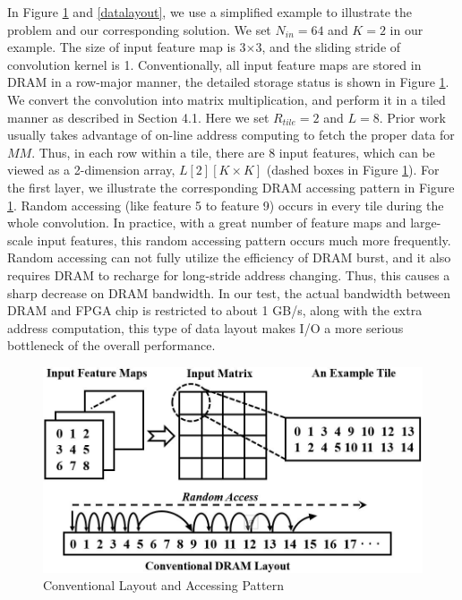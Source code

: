 \documentclass{acm_proc_article-sp-copy}
\begin{document}
In Figure \ref{conventional} and \ref{datalayout}, we use a simplified example to illustrate the problem and our corresponding solution. We set $N_{in}=64$ and $K=2$ in our example. The size of input feature map is 3$\times$3, and the sliding stride of convolution kernel is 1. Conventionally, all input feature maps are stored in DRAM in a row-major manner, the detailed storage status is shown in Figure \ref{conventional}. We convert the convolution into matrix multiplication, and perform it in a tiled manner as described in Section 4.1. Here we set $R_{tile}=2$ and $L=8$. Prior work \cite{fpga'16} usually takes advantage of on-line address computing to fetch the proper data for $MM$. Thus, in each row within a tile, there are 8 input features, which can be viewed as a 2-dimension array, $L[2][K\times K]$ (dashed boxes in Figure \ref{conventional}). For the first layer, we illustrate the corresponding DRAM accessing pattern in Figure \ref{conventional}. Random accessing (like feature 5 to feature 9) occurs in every tile during the whole convolution. In practice, with a great number of feature maps and large-scale input features, this random accessing pattern occurs much more frequently. Random accessing can not fully utilize the efficiency of DRAM burst, and it also requires DRAM to recharge for long-stride address changing. Thus, this causes a sharp decrease on DRAM bandwidth. In our test, the actual bandwidth between DRAM and FPGA chip is restricted to about 1 GB/s, along with the extra address computation, this type of data layout makes I/O a more serious bottleneck of the overall performance.

\begin{figure}
	\centering
	\includegraphics[width=1.0\linewidth]{./figure/conventional.jpg}
	\caption{Conventional Layout and Accessing Pattern}
	\label{conventional}
\end{figure}
\end{document}
